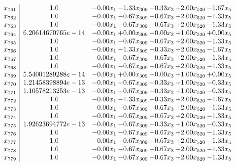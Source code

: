 \documentclass[8pt]{article}
\begin{document}
\[\begin{array}{c| c c@{\hskip 2pt} c@{\hskip 2pt} c@{\hskip 2pt} c@{\hskip 2pt} c@{\hskip 2pt} }
 x_{761}   &  1.0 & -0.00 x_{1} & -1.33 x_{309} & -0.33 x_{3} & +  2.00 x_{520} & -1.67 x_{5}\\
 x_{762}   &  1.0 & -0.00 x_{1} & -0.67 x_{309} & -0.67 x_{3} & +  2.00 x_{520} & -1.33 x_{5}\\
 x_{763}   &  1.0 & -0.00 x_{1} & -0.67 x_{309} & -0.67 x_{3} & +  2.00 x_{520} & -1.33 x_{5}\\
 x_{764}   &  6.20614670765e-14 & -0.00 x_{1} & +  0.00 x_{309} & -0.00 x_{3} & +  1.00 x_{520} & +  0.00 x_{5}\\
 x_{765}   &  1.0 & -0.00 x_{1} & -0.67 x_{309} & -0.67 x_{3} & +  2.00 x_{520} & -1.33 x_{5}\\
 x_{766}   &  1.0 & -0.00 x_{1} & -1.33 x_{309} & -0.33 x_{3} & +  2.00 x_{520} & -1.67 x_{5}\\
 x_{767}   &  1.0 & -0.00 x_{1} & -0.67 x_{309} & -0.67 x_{3} & +  2.00 x_{520} & -1.33 x_{5}\\
 x_{768}   &  1.0 & -0.00 x_{1} & -0.67 x_{309} & -0.67 x_{3} & +  2.00 x_{520} & -1.33 x_{5}\\
 x_{769}   &  5.54001289288e-14 & -0.00 x_{1} & +  0.00 x_{309} & -0.00 x_{3} & +  1.00 x_{520} & +  0.00 x_{5}\\
 x_{770}   &  1.21458398894e-13 & -0.00 x_{1} & -0.67 x_{309} & +  0.33 x_{3} & +  1.00 x_{520} & -0.33 x_{5}\\
 x_{771}   &  1.10578213253e-13 & -0.00 x_{1} & -0.67 x_{309} & +  0.33 x_{3} & +  1.00 x_{520} & -0.33 x_{5}\\
 x_{772}   &  1.0 & -0.00 x_{1} & -1.33 x_{309} & -0.33 x_{3} & +  2.00 x_{520} & -1.67 x_{5}\\
 x_{773}   &  1.0 & -0.00 x_{1} & -0.67 x_{309} & -0.67 x_{3} & +  2.00 x_{520} & -1.33 x_{5}\\
 x_{774}   &  1.0 & -0.00 x_{1} & -0.67 x_{309} & -0.67 x_{3} & +  2.00 x_{520} & -1.33 x_{5}\\
 x_{775}   &  1.92623694772e-13 & -0.00 x_{1} & -0.67 x_{309} & +  0.33 x_{3} & +  1.00 x_{520} & -0.33 x_{5}\\
 x_{776}   &  1.0 & -0.00 x_{1} & -0.67 x_{309} & -0.67 x_{3} & +  2.00 x_{520} & -1.33 x_{5}\\
 x_{777}   &  1.0 & -0.00 x_{1} & -0.67 x_{309} & -0.67 x_{3} & +  2.00 x_{520} & -1.33 x_{5}\\
 x_{778}   &  1.0 & -0.00 x_{1} & -0.67 x_{309} & -0.67 x_{3} & +  2.00 x_{520} & -1.33 x_{5}\\
 x_{779}   &  1.0 & -0.00 x_{1} & -0.67 x_{309} & -0.67 x_{3} & +  2.00 x_{520} & -1.33 x_{5}\\

\end{array}\]
\end{document}
